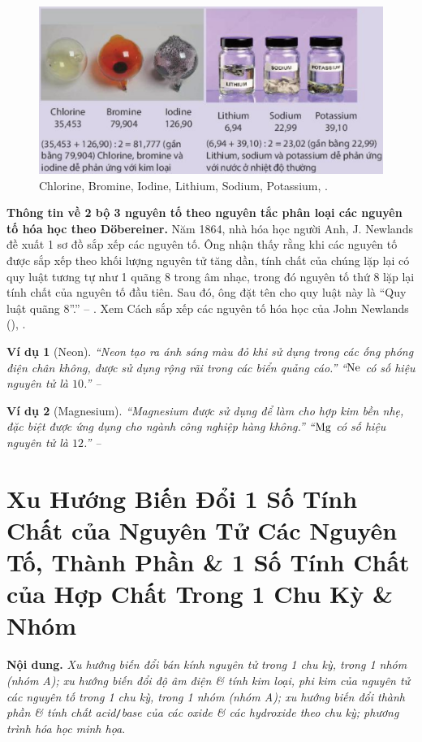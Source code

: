 \documentclass[oneside]{book}
\numberwithin{equation}{section}
\newtheorem{vidu}{Ví dụ}[section]
\begin{document}
\begin{figure}[H]
	\centering
	\includegraphics[scale=0.15]{chlorine_bromine_iodine_lithium_sodium_potassium}
	\caption{Chlorine, Bromine, Iodine, Lithium, Sodium, Potassium, \cite[p. 41]{SGK_Hoa_Hoc_10_Chan_Troi_Sang_Tao}.}
\end{figure}
\textbf{Thông tin về 2 bộ 3 nguyên tố theo nguyên tắc phân loại các nguyên tố hóa học theo D\"obereiner.} Năm 1864, nhà hóa học người Anh, J. Newlands đề xuất 1 sơ đồ sắp xếp các nguyên tố. Ông nhận thấy rằng khi các nguyên tố được sắp xếp theo khối lượng nguyên tử tăng dần, tính chất của chúng lặp lại có quy luật tương tự như 1 quãng 8 trong âm nhạc, trong đó nguyên tố thứ 8 lặp lại tính chất của nguyên tố đầu tiên. Sau đó, ông đặt tên cho quy luật này là ``Quy luật quãng 8''.'' -- \cite[p. 41]{SGK_Hoa_Hoc_10_Chan_Troi_Sang_Tao}. Xem \textsf{Cách sắp xếp các nguyên tố hóa học của John Newlands} (\cite{Buthelezi_Dingrando_Hainen_Wistrom_Zike2013}), \cite[p. 41]{SGK_Hoa_Hoc_10_Chan_Troi_Sang_Tao}.

\begin{vidu}[Neon]
	``Neon tạo ra ánh sáng màu đỏ khi sử dụng trong các ống phóng điện chân không, được sử dụng rộng rãi trong các biển quảng cáo.'' ``$\rm Ne$ có số hiệu nguyên tử là $10$.'' -- \cite[p. 42]{SGK_Hoa_Hoc_10_Chan_Troi_Sang_Tao}
\end{vidu}

\begin{vidu}[Magnesium]
	``\emph{Magnesium} được sử dụng để làm cho hợp kim bền nhẹ, đặc biệt được ứng dụng cho ngành công nghiệp hàng không.'' ``$\rm Mg$ có số hiệu nguyên tử là $12$.'' -- \cite[p. 42]{SGK_Hoa_Hoc_10_Chan_Troi_Sang_Tao}
\end{vidu}


\section{Xu Hướng Biến Đổi 1 Số Tính Chất của Nguyên Tử Các Nguyên Tố, Thành Phần \& 1 Số Tính Chất của Hợp Chất Trong 1 Chu Kỳ \& Nhóm}
\textbf{Nội dung.} \textit{Xu hướng biến đổi bán kính nguyên tử trong 1 chu kỳ, trong 1 nhóm (nhóm A); xu hướng biến đổi độ âm điện \& tính kim loại, phi kim của nguyên tử các nguyên tố trong 1 chu kỳ, trong 1 nhóm (nhóm A); xu hướng biến đổi thành phần \& tính chất acid}\texttt{/}\textit{base của các oxide \& các hydroxide theo chu kỳ; phương trình hóa học minh họa}.
\end{document}
